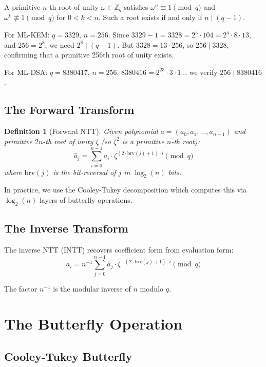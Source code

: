\documentclass[11pt,a4paper]{article}
\newtheorem{definition}{Definition}
\begin{document}
A primitive $n$-th root of unity $\omega \in \mathbb{Z}_q$ satisfies $\omega^n \equiv 1
\pmod{q}$ and $\omega^k \not\equiv 1 \pmod{q}$ for $0 < k < n$. Such a root exists if
and only if $n \mid (q - 1)$.

For ML-KEM: $q = 3329$, $n = 256$. Since $3329 - 1 = 3328 = 2^5 \cdot 104 = 2^5 \cdot 8 \cdot 13$,
and $256 = 2^8$, we need $2^8 \mid (q - 1)$. But $3328 = 13 \cdot 256$, so $256 \mid 3328$,
confirming that a primitive 256th root of unity exists.

For ML-DSA: $q = 8380417$, $n = 256$. $8380416 = 2^{23} \cdot 3 \cdot 1$... we verify
$256 \mid 8380416$.

\subsection{The Forward Transform}

\begin{definition}[Forward NTT]
Given polynomial $a = (a_0, a_1, \ldots, a_{n-1})$ and primitive $2n$-th root of unity
$\zeta$ (so $\zeta^2$ is a primitive $n$-th root):
\[
\hat{a}_j = \sum_{i=0}^{n-1} a_i \cdot \zeta^{(2 \cdot \text{brv}(j) + 1) \cdot i} \pmod{q}
\]
where $\text{brv}(j)$ is the bit-reversal of $j$ in $\log_2(n)$ bits.
\end{definition}

In practice, we use the Cooley-Tukey decomposition which computes this via $\log_2(n)$
layers of butterfly operations.

\subsection{The Inverse Transform}

The inverse NTT (INTT) recovers coefficient form from evaluation form:
\[
a_i = n^{-1} \sum_{j=0}^{n-1} \hat{a}_j \cdot \zeta^{-(2 \cdot \text{brv}(j) + 1) \cdot i} \pmod{q}
\]

The factor $n^{-1}$ is the modular inverse of $n$ modulo $q$.

\section{The Butterfly Operation}

\subsection{Cooley-Tukey Butterfly}
\end{document}
